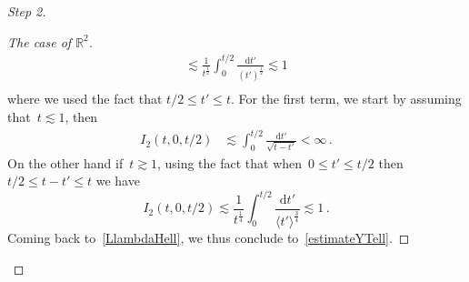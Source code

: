 \documentclass[11pt]{article}
\theoremstyle{definition}
\numberwithin{equation}{section}
\numberwithin{figure}{section}
\numberwithin{table}{section}
\newcommand*{\dd}{\mathrm{d}}
\newcommand*{\dt}{\dd t}
\newenvironment{step}[1]{\begin{proof}[#1]}{\let\qed\relax\end{proof}}
\newcommand*\R {\mathbb{R}}
\begin{document}
\begin{step}{Step 2}
\begin{step}{The case of $\R^2$}
\[\begin{aligned}
\lesssim \frac{1}{t^{\frac12}} \int_{0}^{t/2} \frac {\dt'}{(t')^{\frac12}} \lesssim 1 \\
\end{aligned}
\]
where we used the fact that $t/2 \le t' \le t$. For the first term, we start by assuming that~$t\lesssim 1$, then
\[
\begin{aligned}
I_2(t,0,t/2) &\lesssim \int_0^{t/2} \frac{\dt'}{\sqrt{t-t'}} < \infty\,.
\end{aligned}
\]
On the other hand if~$t\gtrsim 1$, using the fact that when~$0\leq t'\leq t/2$ then~$t/2\leq t-t'\leq t$ we have
\[
I_2(t,0,t/2) \lesssim \frac{1}{t^{\frac14}} \int_0^{t/2} \frac{\dt'}{\langle t'\rangle^\frac34} \lesssim 1 \,.
\]
Coming back to~\eqref{LlambdaHell}, we thus conclude to~\eqref{estimateYTell}.
\end{step}
\end{step}
\end{document}
